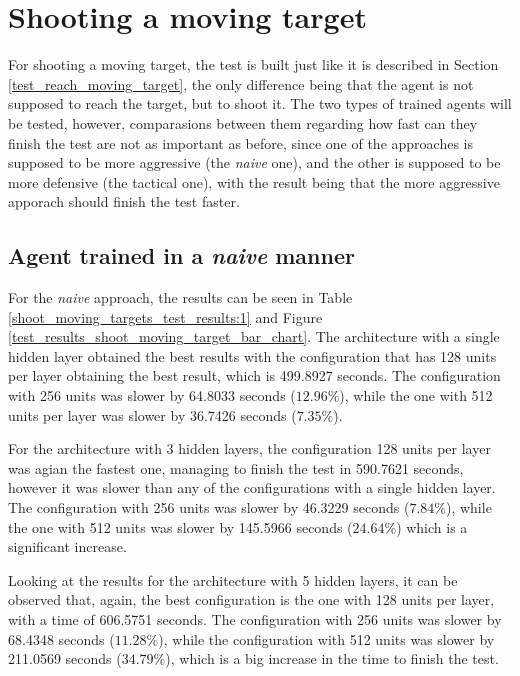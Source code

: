 \section{Shooting a moving target} \label{test_shoot_moving_target}

For shooting a moving target, the test is built just like it is described in Section \ref{test_reach_moving_target}, the only difference being that the agent is not supposed to reach the target, but to shoot it. The two types of trained agents will be tested, however, comparasions between them regarding how fast can they finish the test are not as important as before, since one of the approaches is supposed to be more aggressive (the \emph{naive} one), and the other is supposed to be more defensive (the tactical one), with the result being that the more aggressive apporach should finish the test faster.

\subsection{Agent trained in a \emph{naive} manner}

For the \emph{naive} approach, the results can be seen in Table \ref{shoot_moving_targets_test_results:1} and Figure \ref{test_results_shoot_moving_target_bar_chart}. The architecture with a single hidden layer obtained the best results with the configuration that has 128 units per layer obtaining the best result, which is 499.8927 seconds. The configuration with 256 units was slower by 64.8033 seconds ($12.96\%$), while the one with 512 units per layer was slower by 36.7426 seconds ($7.35\%$).

For the architecture with 3 hidden layers, the configuration 128 units per layer was agian the fastest one, managing to finish the test in 590.7621 seconds, however it was slower than any of the configurations with a single hidden layer. The configuration with 256 units was slower by 46.3229 seconds ($7.84\%$), while the one with 512 units was slower by 145.5966 seconds ($24.64\%$) which is a significant increase.

Looking at the results for the architecture with 5 hidden layers, it can be observed that, again, the best configuration is the one with 128 units per layer, with a time of 606.5751 seconds. The configuration with 256 units was slower by 68.4348 seconds ($11.28\%$), while the configuration with 512 units was slower by 211.0569 seconds ($34.79\%$), which is a big increase in the time to finish the test.

